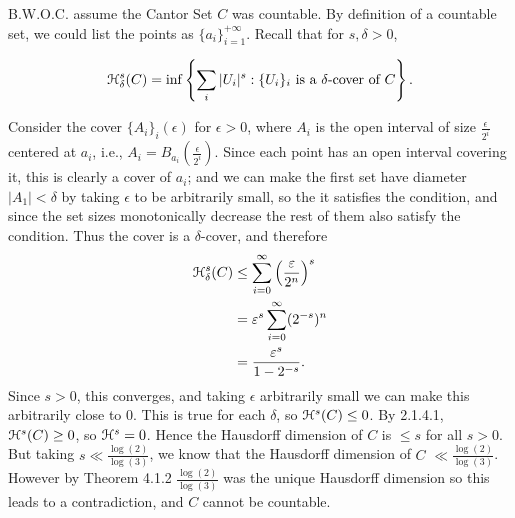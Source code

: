 B.W.O.C. assume the Cantor Set \(C\) was countable. By definition of a countable set, we could list the points as \(\{a_i\}_{i=1}^{+\infty}\). Recall that for \(s,\delta > 0\), 

\[\mathcal{H}_\delta^s (C) = \inf \left\{\sum_i |U_i|^s : \{U_i\}_i \text{ is a } \delta\text{-cover of } C \right\}.\]

Consider the cover \(\{A_i\}_i(\epsilon)\) for \(\epsilon > 0\), where \(A_i\) is the open interval of size \(\frac{\epsilon}{2^i}\) centered at \(a_i\), i.e., \(A_i = B_{a_i} \left(\frac{\epsilon}{2^i}\right)\). Since each point has an open interval covering it, this is clearly a cover of \(a_i\); and we can make the first set have diameter \(|A_1| < \delta\) by taking \(\epsilon\) to be arbitrarily small, so the it satisfies the condition, and since the set sizes monotonically decrease the rest of them also satisfy the condition. Thus the cover is a \(\delta\)-cover, and therefore
\begin{align*} 
 \mathcal{H}_\delta^s (C) &\leq \sum_{i=0}^\infty \left(\frac{\varepsilon}{2^n}\right)^s \\
 &= \varepsilon^s \sum_{i=0}^{\infty} (2^{-s})^n \\
 &= \frac{\varepsilon^s}{1-2^{-s}}.
\end{align*}
Since \(s > 0\), this converges, and taking \(\epsilon\) arbitrarily small we can make this arbitrarily close to 0. This is true for each \(\delta\), so \(\mathcal{H}^s(C) \leq 0\). By 2.1.4.1, \(\mathcal{H}^s(C) \geq 0\), so \(\mathcal{H}^s = 0\). Hence the Hausdorff dimension of \(C\) is \(\leq s\) for all \(s > 0\). But taking \(s \ll \frac{\log(2)}{\log(3)}\), we know that the Hausdorff dimension of \(C\) \( \ll \frac{\log(2)}{\log(3)}\). However by Theorem 4.1.2 \(\frac{\log(2)}{\log(3)}\) was the unique Hausdorff dimension so this leads to a contradiction, and \(C\) cannot be countable.